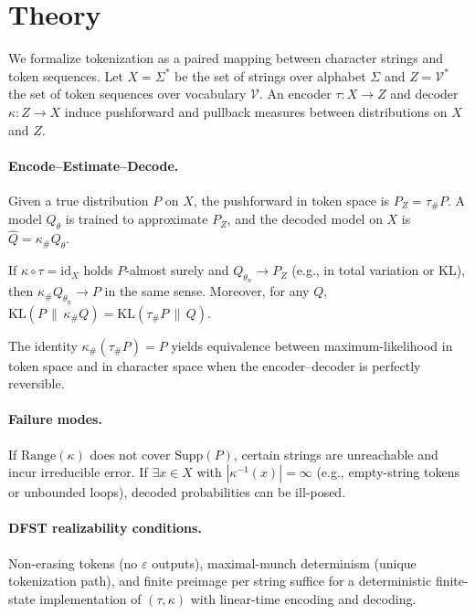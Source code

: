 \section{Theory}
\label{sec:theory}

\noindent We formalize tokenization as a paired mapping between character strings and token sequences.
Let $X=\Sigma^*$ be the set of strings over alphabet $\Sigma$ and $Z=\mathcal{V}^*$ the set of token sequences over vocabulary $\mathcal{V}$. An encoder $\tau\!:\!X\to Z$ and decoder $\kappa\!:\!Z\to X$ induce pushforward and pullback measures between distributions on $X$ and $Z$.

\paragraph{Encode–Estimate–Decode.}
Given a true distribution $P$ on $X$, the pushforward in token space is $P_Z=\tau_{\#}P$. A model $Q_\theta$ is trained to approximate $P_Z$, and the decoded model on $X$ is $\widehat{Q}=\kappa_{\#}Q_\theta$.

\makeatletter
{}
\makeatother

\begin{theorem}\label{thm:consistency}
If $\kappa\circ\tau=\mathrm{id}_X$ holds $P$-almost surely and $Q_{\theta_n}\to P_Z$ (e.g., in total variation or KL), then $\kappa_{\#}Q_{\theta_n}\to P$ in the same sense. Moreover, for any $Q$, $\mathrm{KL}(P\,\|\,\kappa_{\#}Q)=\mathrm{KL}(\tau_{\#}P\,\|\,Q)$.
\end{theorem}

\noindent The identity $\kappa_{\#}(\tau_{\#}P)=P$ yields equivalence between maximum-likelihood in token space and in character space when the encoder–decoder is perfectly reversible.

\paragraph{Failure modes.}
If $\mathrm{Range}(\kappa)$ does not cover $\mathrm{Supp}(P)$, certain strings are unreachable and incur irreducible error. If $\exists x\in X$ with $|\kappa^{-1}(x)|=\infty$ (e.g., empty-string tokens or unbounded loops), decoded probabilities can be ill-posed.

\paragraph{DFST realizability conditions.}
Non-erasing tokens (no $\varepsilon$ outputs), maximal-munch determinism (unique tokenization path), and finite preimage per string suffice for a deterministic finite-state implementation of $(\tau,\kappa)$ with linear-time encoding and decoding.

